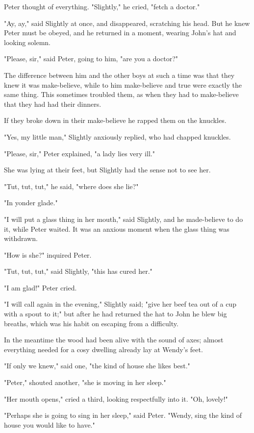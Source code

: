 Peter thought of everything.
"Slightly," he cried, "fetch a doctor."

"Ay, ay," said Slightly at once, and disappeared, scratching his head.
But he knew Peter must be obeyed, and he returned in a moment, wearing John's hat and looking solemn.

"Please, sir," said Peter, going to him, "are you a doctor?"

The difference between him and the other boys at such a time was that they knew it was make-believe,
while to him make-believe and true were exactly the same thing.
This sometimes troubled them, as when they had to make-believe that they had had their dinners.

If they broke down in their make-believe he rapped them on the knuckles.

"Yes, my little man," Slightly anxiously replied, who had chapped knuckles.

"Please, sir," Peter explained, "a lady lies very ill."

She was lying at their feet, but Slightly had the sense not to see her.

"Tut, tut, tut," he said, "where does she lie?"

"In yonder glade."

"I will put a glass thing in her mouth," said Slightly,
and he made-believe to do it, while Peter waited.
It was an anxious moment when the glass thing was withdrawn.

"How is she?\@" inquired Peter.

"Tut, tut, tut," said Slightly, "this has cured her."

"I am glad!\@" Peter cried.

"I will call again in the evening," Slightly said;
"give her beef tea out of a cup with a spout to it;"
but after he had returned the hat to John he blew big breaths,
which was his habit on escaping from a difficulty.

In the meantime the wood had been alive with the sound of axes;
almost everything needed for a cosy dwelling already lay at Wendy's feet.

"If only we knew," said one, "the kind of house she likes best."

"Peter," shouted another, "she is moving in her sleep."

"Her mouth opens," cried a third, looking respectfully into it.
"Oh, lovely!"

"Perhaps she is going to sing in her sleep," said Peter.
"Wendy, sing the kind of house you would like to have."

